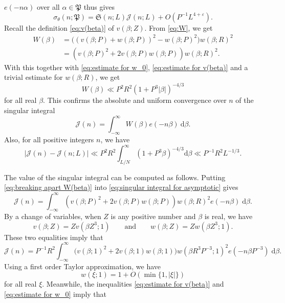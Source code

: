 \documentclass[12pt,english,reqno]{amsart}
\theoremstyle{definition}
\theoremstyle{remark}
\numberwithin{equation}{section}
\numberwithin{equation}{section}
\numberwithin{figure}{section}
\theoremstyle{plain}
\theoremstyle{plain}
\theoremstyle{plain}
\theoremstyle{plain}
\numberwithin{equation}{section}
\numberwithin{thm}{section}
\begin{document}
$e(-n\alpha)$ over all $\alpha\in\mathfrak{P}$ thus gives
\begin{equation}
\sigma_{\theta}(n;\mathfrak{P})=\mathfrak{S}(n;L)\mathcal{J}(n;L)+O(P^{-1}L^{4+\varepsilon}).\label{eq:truncated asymptotic for asymptotic}\end{equation}
Recall the definition \eqref{eq:v(beta)} of $v(\beta;Z)$. From \eqref{eq:W},
we get
\begin{align}
W(\beta)&=\Big((v(\beta;P)+w(\beta;P))^{2}-w(\beta;P)^{2}\Big)w(\beta;R)^{2}\nonumber\\&=(v(\beta;P)^{2}+2v(\beta;P)w(\beta;P))w(\beta;R)^{2}.\label{eq:breaking apart W(beta)}\end{align}
With this together with \eqref{eq:estimate for w_0}, \eqref{eq:estimate for v(beta)} and a trivial
estimate for $w(\beta;R)$, we get
\[
W(\beta)\ll P^{2}R^{2}(1+P^{3}|\beta|)^{-4/3}\]
for all real $\beta$. This confirms the absolute and uniform
convergence over $n$ of the singular integral
\begin{equation}
\mathcal{J}(n)=\int_{-\infty}^{\infty}W(\beta)e(-n\beta)\:\mathrm{d}\beta.\label{eq:singular integral for asymptotic}\end{equation}
Also, for all positive integers $n$, we have
\begin{equation}
|\mathcal{J}(n)-\mathcal{J}(n;L)|\ll P^{2}R^{2}\int_{L/N}^{\infty}(1+P^{3}\beta)^{-4/3}\mathrm{d}\beta\ll P^{-1}R^{2}L^{-1/3}.\label{eq:tail of singular integral for asymptotic}\end{equation}
\par The value of the singular integral can be computed as follows. Putting \eqref{eq:breaking apart W(beta)} into \eqref{eq:singular integral for asymptotic} gives
\[
\mathcal{J}(n)=\int_{-\infty}^{\infty}(v(\beta;P)^{2}+2v(\beta;P)w(\beta;P))w(\beta;R)^{2}e(-n\beta)\;\mathrm{d}\beta.\]
By a change of variables, when $Z$ is any positive number and $\beta$ is real, we have
\[
v(\beta;Z)=Zv(\beta Z^3;1)\qquad\text{and}\qquad w(\beta;Z)=Zw(\beta Z^3;1).\]
These two equalities imply that
\begin{equation}
\mathcal{J}(n)=P^{-1}R^2\int_{-\infty}^{\infty}\Big(v(\beta;1)^2+2v(\beta;1)w(\beta;1)\Big)w(\beta R^3P^{-3};1)^2e(-n\beta P^{-3})\;\mathrm{d}\beta.\label{eq:J(n) before error term appears}\end{equation}
Using a first order Taylor approximation, we have
\[
w(\xi;1)=1+O(\min\{1,|\xi|\})\]
for all real $\xi$. Meanwhile, the inequalities \eqref{eq:estimate for v(beta)} and \eqref{eq:estimate for w_0} imply that
\end{document}
